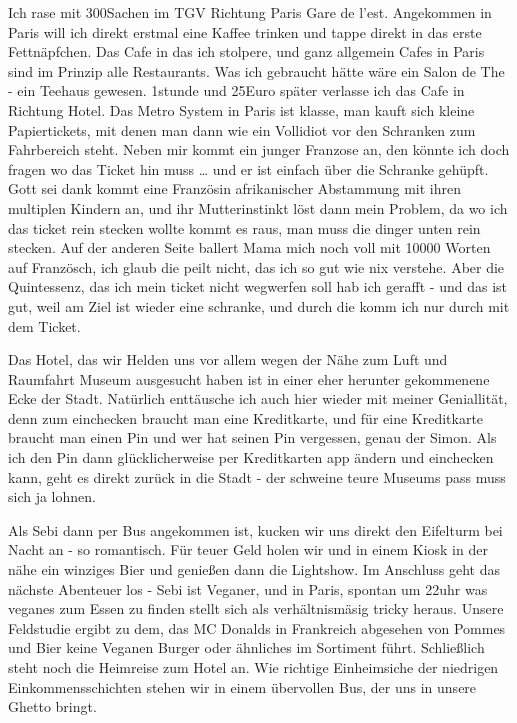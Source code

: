 \documentclass[20pt]{extarticle}
\begin{document}
Ich rase mit 300Sachen im TGV Richtung Paris Gare de
l'est. Angekommen in Paris will ich direkt erstmal eine Kaffee
trinken und tappe direkt in das erste Fettnäpfchen. Das Cafe in das
ich stolpere, und ganz allgemein Cafes in Paris sind im Prinzip alle
Restaurants. Was ich gebraucht hätte wäre ein Salon de The - ein
Teehaus gewesen. 1stunde und 25Euro später verlasse ich das Cafe in
Richtung Hotel. Das Metro System in Paris ist klasse, man kauft sich
kleine Papiertickets, mit denen man dann wie ein Vollidiot vor den
Schranken zum Fahrbereich steht. Neben mir kommt ein junger Franzose
an, den könnte ich doch fragen wo das Ticket hin muss \dots{} und er
ist einfach über die Schranke gehüpft. Gott sei dank kommt eine
Französin afrikanischer Abstammung mit ihren multiplen Kindern an,
und ihr Mutterinstinkt löst dann mein Problem, da wo ich das ticket
rein stecken wollte kommt es raus, man muss die dinger unten rein
stecken. Auf der anderen Seite ballert Mama mich noch voll mit 10000
Worten auf Französch, ich glaub die peilt nicht, das ich so gut wie
nix verstehe. Aber die Quintessenz, das ich mein ticket nicht
wegwerfen soll hab ich gerafft - und das ist gut, weil am Ziel ist
wieder eine schranke, und durch die komm ich nur durch mit dem
Ticket. \newline

Das Hotel, das wir Helden uns vor allem wegen der Nähe zum Luft und
Raumfahrt Museum ausgesucht haben ist in einer eher herunter
gekommenene Ecke der Stadt. Natürlich enttäusche ich auch hier
wieder mit meiner Geniallität, denn zum einchecken braucht man eine
Kreditkarte, und für eine Kreditkarte braucht man einen Pin und wer
hat seinen Pin vergessen, genau der Simon. Als ich den Pin dann
glücklicherweise per Kreditkarten app ändern und einchecken kann,
geht es direkt zurück in die Stadt - der schweine teure Museums pass
muss sich ja lohnen. \newline 

Als Sebi dann per Bus angekommen ist, kucken wir uns direkt den
Eifelturm bei Nacht an - so romantisch. Für teuer Geld holen wir und
in einem Kiosk in der nähe ein winziges Bier und genießen dann die
Lightshow. Im Anschluss geht das nächste Abenteuer los - Sebi ist
Veganer, und in Paris, spontan um 22uhr was veganes zum Essen zu
finden stellt sich als verhältnismäsig tricky heraus. Unsere
Feldstudie ergibt zu dem, das MC Donalds in Frankreich abgesehen von
Pommes und Bier keine Veganen Burger oder ähnliches im Sortiment
führt. Schließlich steht noch die Heimreise zum Hotel an. Wie
richtige Einheimsiche der niedrigen Einkommensschichten stehen wir
in einem übervollen Bus, der uns in unsere Ghetto
bringt. \newline
\end{document}
